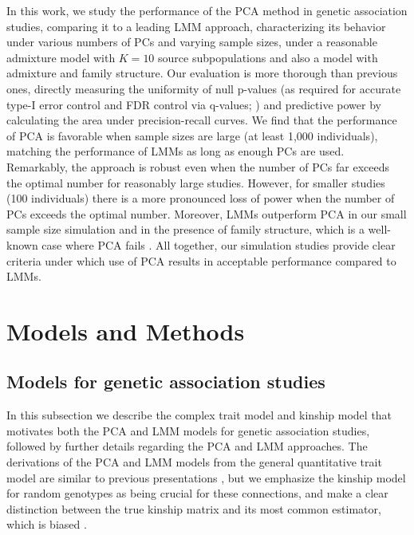 \documentclass[11pt]{article}
\begin{document}
In this work, we study the performance of the PCA method in genetic association studies, comparing it to a leading LMM approach, characterizing its behavior under various numbers of PCs and varying sample sizes, under a reasonable admixture model with $K = 10$ source subpopulations and also a model with admixture and family structure.
Our evaluation is more thorough than previous ones, directly measuring the uniformity of null p-values (as required for accurate type-I error control and FDR control via q-values; \cite{storey_positive_2003, storey_statistical_2003}) and predictive power by calculating the area under precision-recall curves.
We find that the performance of PCA is favorable when sample sizes are large (at least 1,000 individuals), matching the performance of LMMs as long as enough PCs are used.
Remarkably, the approach is robust even when the number of PCs far exceeds the optimal number for reasonably large studies.
However, for smaller studies (100 individuals) there is a more pronounced loss of power when the number of PCs exceeds the optimal number.
Moreover, LMMs outperform PCA in our small sample size simulation and in the presence of family structure, which is a well-known case where PCA fails \citep{patterson_population_2006, price_new_2010}.
All together, our simulation studies provide clear criteria under which use of PCA results in acceptable performance compared to LMMs.


\section{Models and Methods}

\subsection{Models for genetic association studies}

In this subsection we describe the complex trait model and kinship model that motivates both the PCA and LMM models for genetic association studies, followed by further details regarding the PCA and LMM approaches.
The derivations of the PCA and LMM models from the general quantitative trait model are similar to previous presentations \citep{astle_population_2009, janss_inferences_2012, hoffman_correcting_2013}, but we emphasize the kinship model for random genotypes as being crucial for these connections, and make a clear distinction between the true kinship matrix and its most common estimator, which is biased \citep{ochoa_fst2, ochoa_human}.
\end{document}

